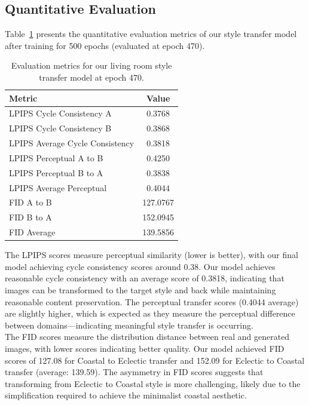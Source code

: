 \documentclass[twocolumn,superscriptaddress,aps]{revtex4-1}
\begin{document}
\subsection{Quantitative Evaluation}

Table~\ref{tab:metrics} presents the quantitative evaluation metrics of our style transfer model after training for 500 epochs (evaluated at epoch 470).

\begin{table}[h]
\centering
\begin{tabular}{lc}
\hline
\textbf{Metric} & \textbf{Value} \\
\hline
LPIPS Cycle Consistency A & 0.3768 \\
LPIPS Cycle Consistency B & 0.3868 \\
LPIPS Average Cycle Consistency & 0.3818 \\
LPIPS Perceptual A to B & 0.4250 \\
LPIPS Perceptual B to A & 0.3838 \\
LPIPS Average Perceptual & 0.4044 \\
FID A to B & 127.0767 \\
FID B to A & 152.0945 \\
FID Average & 139.5856 \\
\hline
\end{tabular}
\caption{Evaluation metrics for our living room style transfer model at epoch 470.}
\label{tab:metrics}
\end{table}

The LPIPS scores measure perceptual similarity (lower is better), with our final model achieving cycle consistency scores around 0.38. Our model achieves reasonable cycle consistency with an average score of 0.3818, indicating that images can be transformed to the target style and back while maintaining reasonable content preservation. The perceptual transfer scores (0.4044 average) are slightly higher, which is expected as they measure the perceptual difference between domains—indicating meaningful style transfer is occurring. \\

The FID scores measure the distribution distance between real and generated images, with lower scores indicating better quality. Our model achieved FID scores of 127.08 for Coastal to Eclectic transfer and 152.09 for Eclectic to Coastal transfer (average: 139.59). The asymmetry in FID scores suggests that transforming from Eclectic to Coastal style is more challenging, likely due to the simplification required to achieve the minimalist coastal aesthetic.
\end{document}
